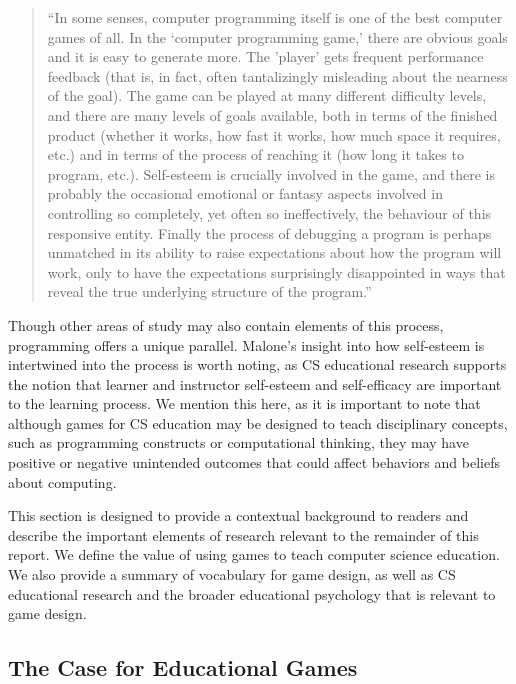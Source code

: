 \documentclass{sig-alternate-05-2015}
\begin{document}
\begin{quote}


``In some senses, computer programming itself is one of the best computer games of all. In the `computer programming game,' there are obvious goals and it is easy to generate more. The 'player' gets frequent performance feedback (that is, in fact, often tantalizingly misleading about the nearness of the goal). The game can be played at many different difficulty levels, and there are many levels of goals available, both in terms of the finished product (whether it works, how fast it works, how much space it requires, etc.) and in terms of the process of reaching it (how long it takes to program, etc.). Self-esteem is crucially involved in the game, and there is probably the occasional emotional or fantasy aspects involved in controlling so completely, yet often so ineffectively, the behaviour of this responsive entity. Finally the process of debugging a program is perhaps unmatched in its ability to raise expectations about how the program will work, only to have the expectations surprisingly disappointed in ways that reveal the true underlying structure of the program.''\end{quote}




Though other areas of study may also contain elements of this process, programming offers a unique parallel. Malone's insight into how self-esteem is intertwined into the process is worth noting, as CS educational research supports the notion that learner and instructor self-esteem and self-efficacy are important to the learning process. We mention this here, as it is important to note that although games for CS education may be designed to teach disciplinary concepts, such as programming constructs or computational thinking, they may have positive or negative unintended outcomes that could affect behaviors and beliefs about computing. 



This section is designed to provide a contextual background to readers and describe the important elements of research relevant to the remainder of this report. We define the value of using games to teach computer science education. We also provide a summary of vocabulary for game design, as well as CS educational research and the broader educational psychology that is relevant to game design.\subsection{The Case for Educational Games}
\end{document}
